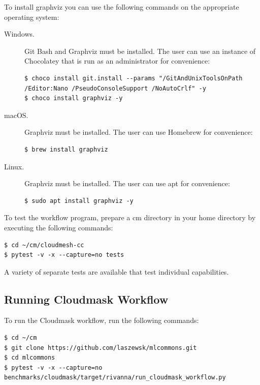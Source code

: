 To install graphviz you can use the following commands on the appropriate operating system:

\begin{description}

\item[Windows.]
Git Bash and Graphviz must be installed.
The user can use an instance of Chocolatey that is run as an administrator for convenience:

\begin{verbatim}
$ choco install git.install --params "/GitAndUnixToolsOnPath /Editor:Nano /PseudoConsoleSupport /NoAutoCrlf" -y
$ choco install graphviz -y
\end{verbatim}

\item[macOS.] Graphviz must be installed. The user can use Homebrew for convenience:

\begin{verbatim}
$ brew install graphviz
\end{verbatim}

\item[Linux.] Graphviz must be installed. The user can use apt for convenience:

\begin{verbatim}
$ sudo apt install graphviz -y
\end{verbatim}

\end{description}

To test the workflow program, prepare a cm directory in your home
directory by executing the following commands:

\begin{verbatim}
$ cd ~/cm/cloudmesh-cc
$ pytest -v -x --capture=no tests
\end{verbatim}

A variety of separate tests are available that test individual capabilities. 


% 


\subsection{Running Cloudmask Workflow}\label{sec:running-cloudmask}

To run the Cloudmask workflow, run the following commands:

\begin{verbatim}
$ cd ~/cm
$ git clone https://github.com/laszewsk/mlcommons.git
$ cd mlcommons
$ pytest -v -x --capture=no benchmarks/cloudmask/target/rivanna/run_cloudmask_workflow.py
\end{verbatim}


